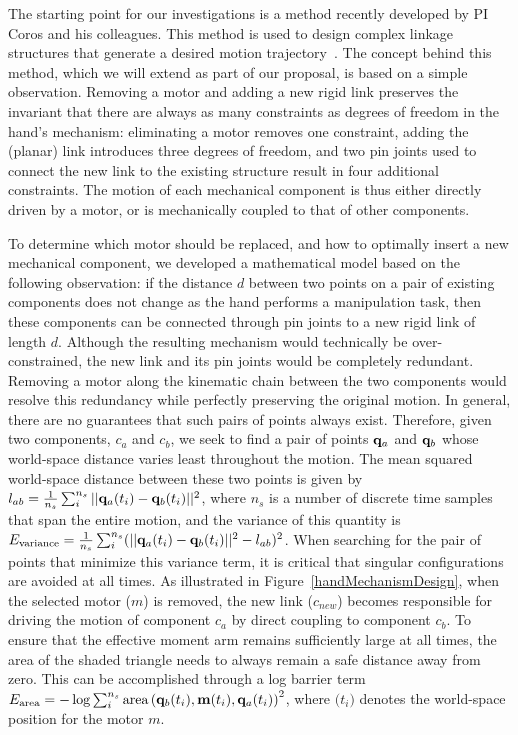 The starting point for our investigations is a method recently developed by PI Coros and his colleagues. This method is used to design complex linkage structures that generate a desired motion trajectory~\cite{Thomaszewski14CDL}. The concept behind this method, which we will extend as part of our proposal, is based on a simple observation. Removing a motor and adding a new rigid link preserves the invariant that there are always as many constraints as degrees of freedom in the hand's mechanism: eliminating a motor removes one constraint, adding the (planar) link introduces three degrees of freedom, and two pin joints used to connect the new link to the existing structure result in four additional constraints. The motion of each mechanical component is thus either directly driven by a motor, or is mechanically coupled to that of other components.

To determine which motor should be replaced, and how to optimally insert a new mechanical component, we developed a mathematical model based on the following observation: if the distance $d$ between two points on a pair of existing components does not change as the hand performs a manipulation task, then these components can be connected through pin joints to a new rigid link of length $d$. Although the resulting mechanism would technically be over-constrained, the new link and its pin joints would be completely redundant. Removing a motor along the kinematic chain between the two components would resolve this redundancy while perfectly preserving the original motion. In general, there are no guarantees that such pairs of points always exist. Therefore, given two components, $c_a$ and $c_b$, we seek to find a pair of points $\mathbf{q}_a$ and $\mathbf{q}_b$ whose world-space distance varies least throughout the motion. The mean squared world-space distance between these two points is given by $l_{ab}=\frac{1}{n_s}\sum_i^{n_s}||\mathbf{q}_a(t_i)-\mathbf{q}_b(t_i)||^2$, where $n_s$ is a number of discrete time samples that span the entire motion, and the variance of this quantity is $ E_\mathrm{variance}=\frac{1}{n_s}\sum_i^{n_s}(||\mathbf{q}_a(t_i)-\mathbf{q}_b(t_i)||^2-l_{ab})^2$. When searching for the pair of points that minimize this variance term, it is critical that singular configurations are avoided at all times. As illustrated in Figure~\ref{handMechanismDesign}, when the selected motor ($m$) is removed, the new link ($c_{new}$) becomes responsible for driving the motion of component $c_a$ by direct coupling to component $c_b$. To ensure that the effective moment arm remains sufficiently large at all times, the area of the shaded triangle needs to always remain a safe distance away from zero. This can be accomplished through a log barrier term $E_\mathrm{area} = -\log\sum_i^{n_s}\text{area}\left(\mathbf{q}_b(t_i),\mathbf{m}(t_i),\mathbf{q}_a(t_i)\right)^2$, where $\bm(t_i)$ denotes the world-space position for the motor $m$.

